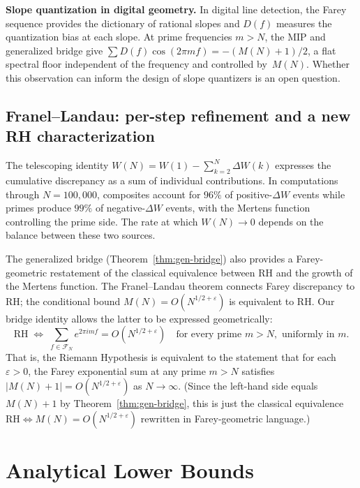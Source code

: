 \documentclass[11pt]{article}
\theoremstyle{definition}
\newcommand{\F}{\mathcal{F}}
\begin{document}
\textbf{Slope quantization in digital geometry.}\quad
In digital line detection, the Farey sequence provides the
dictionary of rational slopes and $D(f)$ measures the
quantization bias at each slope.
At prime frequencies $m > N$, the MIP and generalized bridge
give $\sum D(f) \cos(2\pi mf) = -(M(N)+1)/2$, a flat spectral
floor independent of the frequency and controlled by~$M(N)$.
Whether this observation can inform the design of slope
quantizers is an open question.

\subsection{Franel--Landau: per-step refinement and a new RH
characterization}

The telescoping identity $W(N) = W(1) - \sum_{k=2}^{N} \Delta W(k)$
expresses the cumulative discrepancy as a sum of individual
contributions.  In computations through $N = 100{,}000$,
composites account for $96\%$ of positive-$\Delta W$ events
while primes produce $99\%$ of negative-$\Delta W$ events, with the
Mertens function controlling the prime side.  The rate at which
$W(N) \to 0$ depends on the balance between these two sources.

The generalized bridge (Theorem~\ref{thm:gen-bridge}) also
provides a Farey-geometric restatement of the classical
equivalence between RH and the growth of the Mertens function.
The Franel--Landau theorem connects Farey discrepancy to RH\@;
the conditional bound
$M(N) = O(N^{1/2+\varepsilon})$ is equivalent to RH\@.
Our bridge identity allows the latter to be expressed
geometrically:
\[
  \text{RH} \;\Longleftrightarrow\;
  \sum_{f \in \F_N} e^{2\pi i m f} = O(N^{1/2+\varepsilon})
  \quad\text{for every prime } m > N, \text{ uniformly in } m.
\]
That is, the Riemann Hypothesis is equivalent to the statement
that for each $\varepsilon > 0$, the Farey exponential sum at any
prime $m > N$ satisfies $|M(N)+1| = O(N^{1/2+\varepsilon})$
as $N \to \infty$.  (Since the left-hand side equals $M(N)+1$ by
Theorem~\ref{thm:gen-bridge}, this is just the classical
equivalence $\text{RH} \Leftrightarrow M(N) = O(N^{1/2+\varepsilon})$
rewritten in Farey-geometric language.)


\section{Analytical Lower Bounds}\label{sec:lower-bounds}
\end{document}
